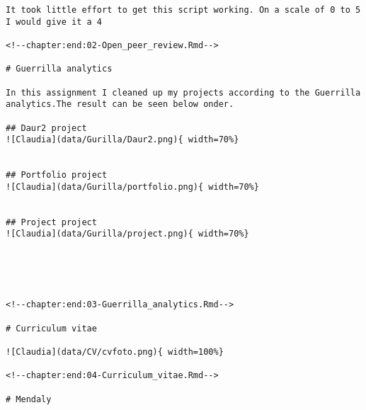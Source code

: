 \documentclass[
]{book}
\begin{document}
\begin{verbatim}
It took little effort to get this script working. On a scale of 0 to 5 I would give it a 4

<!--chapter:end:02-Open_peer_review.Rmd-->

# Guerrilla analytics

In this assignment I cleaned up my projects according to the Guerrilla analytics.The result can be seen below onder. 

## Daur2 project
![Claudia](data/Gurilla/Daur2.png){ width=70%}


## Portfolio project
![Claudia](data/Gurilla/portfolio.png){ width=70%}


## Project project
![Claudia](data/Gurilla/project.png){ width=70%}





<!--chapter:end:03-Guerrilla_analytics.Rmd-->

# Curriculum vitae

![Claudia](data/CV/cvfoto.png){ width=100%}

<!--chapter:end:04-Curriculum_vitae.Rmd-->

# Mendaly


\end{verbatim}
\end{document}
